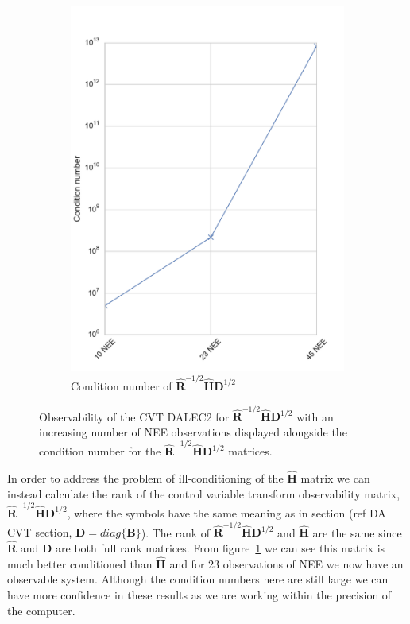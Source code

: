 \documentclass[11pt]{article}
\begin{document}
\begin{figure}[ht]
\begin{subfigure}[b]{0.4\textwidth}
        \includegraphics[width=\textwidth]{dalec2_obsrankcvtcond.pdf}
        \caption{Condition number of $\hat{\textbf{R}}^{-1/2}\hat{\textbf{H}}\textbf{D}^{1/2}$}
        \label{fig:D2_observabilitycondcvt}
    \end{subfigure}
    \caption{Observability of the CVT DALEC2 for $\hat{\textbf{R}}^{-1/2}\hat{\textbf{H}}\textbf{D}^{1/2}$ with an increasing number of NEE observations displayed alongside the condition number for the $\hat{\textbf{R}}^{-1/2}\hat{\textbf{H}}\textbf{D}^{1/2}$ matrices.}
    \label{fig:D2_cvtobservability}
\end{figure}

In order to address the problem of ill-conditioning of the $\hat{\textbf{H}}$ matrix we can instead calculate the rank of the control variable transform observability matrix, $\hat{\textbf{R}}^{-1/2}\hat{\textbf{H}}\textbf{D}^{1/2}$, where the symbols have the same meaning as in section ({\color{red}ref DA CVT section, $\textbf{D} = diag\{\textbf{B}\}$}). The rank of $\hat{\textbf{R}}^{-1/2}\hat{\textbf{H}}\textbf{D}^{1/2}$ and $\hat{\textbf{H}}$ are the same since $\hat{\textbf{R}}$ and $\textbf{D}$ are both full rank matrices. From figure~\ref{fig:D2_observabilitycondcvt} we can see this matrix is much better conditioned than $\hat{\textbf{H}}$ and for 23 observations of NEE we now have an observable system. Although the condition numbers here are still large we can have more confidence in these results as we are working within the precision of the computer.
\end{document}
